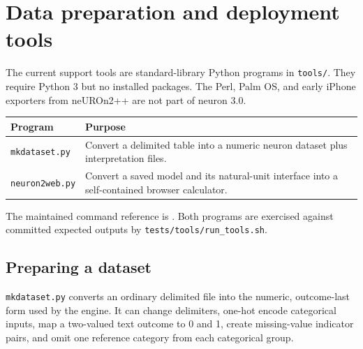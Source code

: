 \chapter{Data preparation and deployment tools}\label{utility_chap}

The current support tools are standard-library Python programs in
\texttt{tools/}.  They require Python 3 but no installed packages.
The Perl, Palm OS, and early iPhone exporters from neUROn2++ are not
part of neuron 3.0.

\begin{center}
\begin{tabular}{|>{\raggedright\arraybackslash}p{1.25in}|>{\raggedright\arraybackslash}p{2.95in}|}
\hline
\textbf{Program} & \textbf{Purpose} \\ \hline
\texttt{mkdataset.py} & Convert a delimited table into a numeric
neuron dataset plus interpretation files. \\ \hline
\texttt{neuron2web.py} & Convert a saved model and its natural-unit
interface into a self-contained browser calculator. \\ \hline
\end{tabular}
\end{center}

The maintained command reference is .  Both
programs are exercised against committed expected outputs by
\texttt{tests/tools/run\_tools.sh}.

\section{Preparing a dataset}

\texttt{mkdataset.py} converts an ordinary delimited file into the
numeric, outcome-last form used by the engine.  It can change
delimiters, one-hot encode categorical inputs, map a two-valued text
outcome to 0 and 1, create missing-value indicator pairs, and omit one
reference category from each categorical group.

